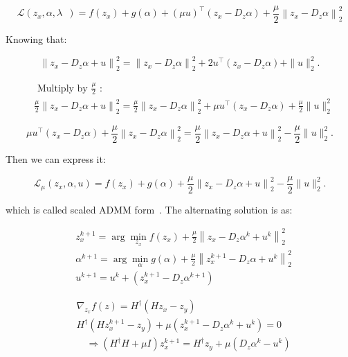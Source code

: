 \documentclass{article}
\newcounter{subsubsubsection}[subsubsection]
\theoremstyle{definition}
\begin{document}
$$
\mathcal{L}\left(z_x, \alpha, \lambda_{\text { }}\right)=f\left(z_x\right)+g(\alpha)+(\mu u)^{\top}\left(z_x-D_z \alpha\right)+\frac{\mu}{2}\left\|z_x-D_z \alpha\right\|_2^2
$$

Knowing that:

$$
\left\|z_x-D_z \alpha+u\right\|_2^2=\left\|z_x-D_z \alpha\right\|_2^2+2 u^{\top}\left(z_x-D_z \alpha\right)+\|u\|_2^2 .
$$



$$
\begin{aligned}
&\text { Multiply by } \frac{\mu}{2} \text { : }\\
&\frac{\mu}{2}\left\|z_x-D_z \alpha+u\right\|_2^2=\frac{\mu}{2}\left\|z_x-D_z \alpha\right\|_2^2+\mu u^{\top}\left(z_x-D_z \alpha\right)+\frac{\mu}{2}\|u\|_2^2
\end{aligned}
$$



$$
\mu u^{\top}\left(z_x-D_z \alpha\right)+\frac{\mu}{2}\left\|z_x-D_z \alpha\right\|_2^2=\frac{\mu}{2}\left\|z_x-D_z \alpha+u\right\|_2^2-\frac{\mu}{2}\|u\|_2^2 .
$$

Then we can express it:

$$
\mathcal{L}_\mu\left(z_x, \alpha, u\right)=f\left(z_x\right)+g(\alpha)+\frac{\mu}{2}\left\|z_x-D_z \alpha+u\right\|_2^2-\frac{\mu}{2}\|u\|_2^2 .
$$

which is called scaled ADMM form~\cite{ScaledADMM}. The alternating solution is as:

$$
\begin{aligned}
& z_x^{k+1}=\arg \min_{z_x} f(z_x)+\frac{\mu}{2}\left\|z_x-D_z \alpha^k+u^k\right\|_2^2 \\
& \alpha^{k+1}=\arg \min _\alpha g(\alpha)+\frac{\mu}{2}\left\|z_x^{k+1}-D_z \alpha+u^k\right\|_2^2 \\
& u^{k+1}=u^k+\left(z_x^{k+1}-D_z \alpha^{k+1}\right)
\end{aligned}
$$




$$
\begin{aligned}
& \nabla_{z_x} f(z)=H^{\dagger}\left(H z_x-z_y\right) \\
& \mathrm{} H^{\dagger}\left(H z_x^{k+1}-z_y\right)+\mu\left(z_x^{k+1}-D_z \alpha^k+u^k\right)=0 \\
& \quad \Longrightarrow\left(H^{\dagger} H+\mu I\right) z_x^{k+1}=H^{\dagger} z_y+\mu\left(D_z \alpha^k-u^k\right)
\end{aligned}
$$
\end{document}

